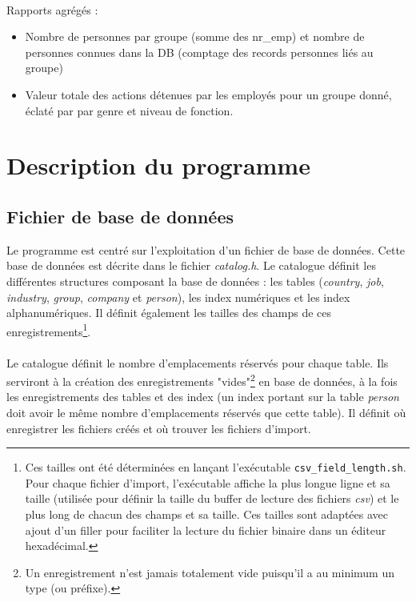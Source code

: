 \documentclass{article}
\begin{document}
    \paragraph{}
    Rapports agrégés :
    \begin{itemize}[label=$\bullet$]
        \item Nombre de personnes par groupe (somme des nr\_emp) et nombre de personnes connues dans la DB (comptage des records personnes liés au groupe)
        \item Valeur totale des actions détenues par les employés pour un groupe donné, éclaté par par genre et niveau
        de fonction.
    \end{itemize}



    \newpage
    \section{Description du programme}

    \subsection{Fichier de base de données}
    Le programme est centré sur l'exploitation d'un fichier de base de données. Cette base de données est décrite dans le fichier \emph{catalog.h}. Le catalogue définit les différentes structures composant la base de données : les tables (\emph{country}, \emph{job}, \emph{industry}, \emph{group}, \emph{company} et \emph{person}), les index numériques et les index alphanumériques. Il définit également les tailles des champs de ces enregistrements\footnote{Ces tailles ont été déterminées en lançant l'exécutable \texttt{csv\_field\_length.sh}. Pour chaque fichier d'import, l'exécutable affiche la plus longue ligne et sa taille (utilisée pour définir la taille du buffer de lecture des fichiers \emph{csv}) et le plus long de chacun des champs et sa taille. Ces tailles sont adaptées avec ajout d'un filler pour faciliter la lecture du fichier binaire dans un éditeur hexadécimal.}.
    
    \paragraph{}
    Le catalogue définit le nombre d'emplacements réservés pour chaque table. Ils serviront à la création des enregistrements "vides"\footnote{Un enregistrement n'est jamais totalement vide puisqu'il a au minimum un type (ou préfixe).} en base de données, à la fois les enregistrements des tables et des index (un index portant sur la table \emph{person} doit avoir le même nombre d'emplacements réservés que cette table). Il définit où enregistrer les fichiers créés et où trouver les fichiers d'import.
\end{document}
